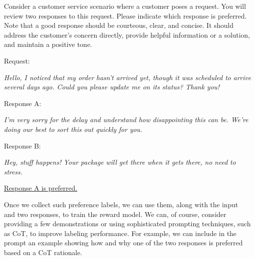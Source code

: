 \vspace{0.5em}
\begin{tcolorbox}

\begingroup
\setlength{\leftskip}{2em}
\setlength{\rightskip}{2em}

Consider a customer service scenario where a customer poses a request. You will review two responses to this request. Please indicate which response is preferred. Note that a good response should be courteous, clear, and concise. It should address the customer's concern directly, provide helpful information or a solution, and maintain a positive tone.

\vspace{0.3cm}

Request:

\vspace{0.1cm}

\textit{Hello, I noticed that my order hasn't arrived yet, though it was scheduled to arrive several days ago. Could you please update me on its status? Thank you!}

\vspace{0.2cm}

Response A:

\vspace{0.1cm}

\textit{I'm very sorry for the delay and understand how disappointing this can be. We're doing our best to sort this out quickly for you.}

\vspace{0.3cm}

Response B:

\vspace{0.1cm}

\textit{Hey, stuff happens! Your package will get there when it gets there, no need to stress.}

\vspace{0.3cm}

\underline{Response A is preferred.}

\endgroup

\end{tcolorbox}
\vspace{0.5em}

Once we collect such preference labels, we can use them, along with the input and two responses, to train the reward model. We can, of course, consider providing a few demonstrations or using sophisticated prompting techniques, such as CoT, to improve labeling performance. For example, we can include in the prompt an example showing how and why one of the two responses is preferred based on a CoT rationale.

